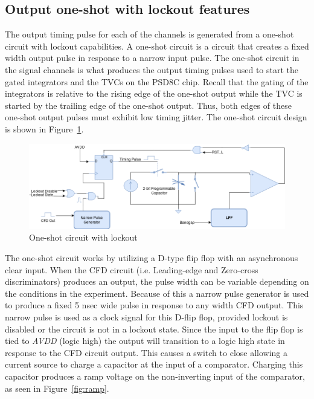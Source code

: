 \documentclass[12pt,oneside,final]{siuethesis}
\theoremstyle{definition}
\begin{document}
\subsection{Output one-shot with lockout features}
\par The output timing pulse for each of the channels is generated from a one-shot circuit with lockout capabilities. A one-shot circuit is a circuit that creates a fixed width output pulse in response to a narrow input pulse. The one-shot circuit in the signal channels is what produces the output timing pulses used to start the gated integrators and the TVCs on the PSD8C chip. Recall that the gating of the integrators is relative to the rising edge of the one-shot output while the TVC is started by the trailing edge of the one-shot output. Thus, both edges of these one-shot output pulses must exhibit low timing jitter. The one-shot circuit design is shown in Figure~\ref{fig:oneshot-circuit}.

\begin{figure}[htbp!]
\centering
\includegraphics[scale=.50,keepaspectratio=true]{./ch3_figures/oneshot_circuit.png} 
\caption{One-shot circuit with lockout}
\label{fig:oneshot-circuit}
\end{figure}

\par The one-shot circuit works by utilizing a D-type flip flop with an asynchronous clear input. When the CFD circuit (i.e. Leading-edge and Zero-cross discriminators) produces an output, the pulse width can be variable depending on the conditions in the experiment. Because of this a narrow pulse generator is used to produce a fixed 5 nsec wide pulse in response to any width CFD output. This narrow pulse is used as a clock signal for this D-flip flop, provided lockout is disabled or the circuit is not in a lockout state. Since the input to the flip flop is tied to \emph{AVDD} (logic high) the output will transition to a logic high state in response to the CFD circuit output. This causes a switch to close allowing a current source to charge a capacitor at the input of a comparator. Charging this capacitor produces a ramp voltage on the non-inverting input of the comparator, as seen in Figure~\ref{fig:ramp}.
\end{document}
